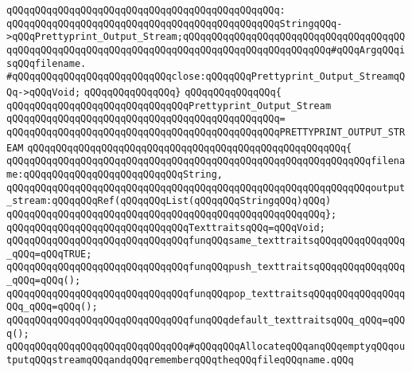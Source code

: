 \verb|qQQqqQQqqQQqqQQqqQQqqQQqqQQqqQQqqQQqqQQqqQQqqQQq:|\newline
\verb|qQQqqQQqqQQqqQQqqQQqqQQqqQQqqQQqqQQqqQQqqQQqqQQqStringqQQq->qQQqPrettyprint_Output_Stream;qQQqqQQqqQQqqQQqqQQqqQQqqQQqqQQqqQQqqQQqqQQqqQQqqQQqqQQqqQQqqQQqqQQqqQQqqQQqqQQqqQQqqQQqqQQqqQQq#qQQqArgqQQqisqQQqfilename.|\newline
\newline
\verb|#qQQqqQQqqQQqqQQqqQQqqQQqqQQqclose:qQQqqQQqPrettyprint_Output_StreamqQQq->qQQqVoid;|\newline
\verb|qQQqqQQqqQQqqQQq}|\newline
\verb|qQQqqQQqqQQqqQQq{|\newline
\verb|qQQqqQQqqQQqqQQqqQQqqQQqqQQqqQQqPrettyprint_Output_Stream|\newline
\verb|qQQqqQQqqQQqqQQqqQQqqQQqqQQqqQQqqQQqqQQqqQQqqQQq=|\newline
\verb|qQQqqQQqqQQqqQQqqQQqqQQqqQQqqQQqqQQqqQQqqQQqqQQqPRETTYPRINT_OUTPUT_STREAM|\newline
\verb|qQQqqQQqqQQqqQQqqQQqqQQqqQQqqQQqqQQqqQQqqQQqqQQqqQQqqQQq{|\newline
\verb|qQQqqQQqqQQqqQQqqQQqqQQqqQQqqQQqqQQqqQQqqQQqqQQqqQQqqQQqqQQqqQQqfilename:qQQqqQQqqQQqqQQqqQQqqQQqqQQqString,|\newline
\verb|qQQqqQQqqQQqqQQqqQQqqQQqqQQqqQQqqQQqqQQqqQQqqQQqqQQqqQQqqQQqqQQqoutput_stream:qQQqqQQqRef(qQQqqQQqList(qQQqqQQqStringqQQq)qQQq)|\newline
\verb|qQQqqQQqqQQqqQQqqQQqqQQqqQQqqQQqqQQqqQQqqQQqqQQqqQQqqQQq};|\newline
\newline
\verb|qQQqqQQqqQQqqQQqqQQqqQQqqQQqqQQqTexttraitsqQQq=qQQqVoid;|\newline
\newline
\verb|qQQqqQQqqQQqqQQqqQQqqQQqqQQqqQQqfunqQQqsame_texttraitsqQQqqQQqqQQqqQQq_qQQq=qQQqTRUE;|\newline
\verb|qQQqqQQqqQQqqQQqqQQqqQQqqQQqqQQqfunqQQqpush_texttraitsqQQqqQQqqQQqqQQq_qQQq=qQQq();|\newline
\verb|qQQqqQQqqQQqqQQqqQQqqQQqqQQqqQQqfunqQQqpop_texttraitsqQQqqQQqqQQqqQQqqQQq_qQQq=qQQq();|\newline
\verb|qQQqqQQqqQQqqQQqqQQqqQQqqQQqqQQqfunqQQqdefault_texttraitsqQQq_qQQq=qQQq();|\newline
\newline
\newline
\verb|qQQqqQQqqQQqqQQqqQQqqQQqqQQqqQQq#qQQqqQQqAllocateqQQqanqQQqemptyqQQqoutputqQQqstreamqQQqandqQQqrememberqQQqtheqQQqfileqQQqname.qQQq|\newline
